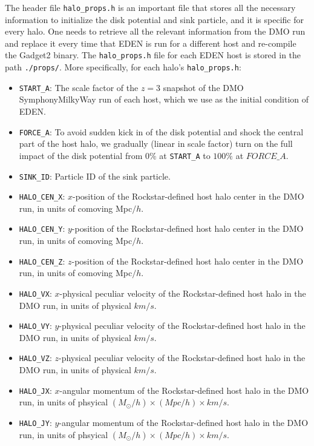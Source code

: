 \documentclass[12pt]{article}
\begin{document}
    The header file \texttt{halo\_props.h} is an important file that stores all the necessary information to initialize the disk potential and sink particle, and it is specific for every halo. One needs to retrieve all the relevant information from the DMO run and replace it every time that EDEN is run for a different host and re-compile the Gadget2 binary. The \texttt{halo\_props.h} file for each EDEN host is stored in the path \texttt{./props/}. More specifically, for each halo's \texttt{halo\_props.h}:
    \begin{itemize}
        \item \texttt{START\_A}: The scale factor of the $z=3$ snapshot of the DMO SymphonyMilkyWay run of each host, which we use as the initial condition of EDEN. 
        \item \texttt{FORCE\_A}: To avoid sudden kick in of the disk potential and shock the central part of the host halo, we gradually (linear in scale factor) turn on the full impact of the disk potential from $0\%$ at \texttt{START\_A} to $100\%$ at $FORCE\_A$.
        \item \texttt{SINK\_ID}: Particle ID of the sink particle.
        \item \texttt{HALO\_CEN\_X}: $x$-position of the Rockstar-defined host halo center in the DMO run, in units of comoving Mpc$/h$.
        \item \texttt{HALO\_CEN\_Y}: $y$-position of the Rockstar-defined host halo center in the DMO run, in units of comoving Mpc$/h$.
        \item \texttt{HALO\_CEN\_Z}: $z$-position of the Rockstar-defined host halo center in the DMO run, in units of comoving Mpc$/h$.
        \item \texttt{HALO\_VX}: $x$-physical peculiar velocity of the Rockstar-defined host halo in the DMO run, in units of physical $km/s$.
        \item \texttt{HALO\_VY}: $y$-physical peculiar velocity of the Rockstar-defined host halo in the DMO run, in units of physical $km/s$.
        \item \texttt{HALO\_VZ}: $z$-physical peculiar velocity of the Rockstar-defined host halo in the DMO run, in units of physical $km/s$.
        \item \texttt{HALO\_JX}: $x$-angular momentum of the Rockstar-defined host halo in the DMO run, in units of phsyical $(M_{\odot}/h) \times (Mpc/h) \times km/s$.
        \item \texttt{HALO\_JY}: $y$-angular momentum of the Rockstar-defined host halo in the DMO run, in units of phsyical $(M_{\odot}/h) \times (Mpc/h) \times km/s$.

\end{itemize}
\end{document}

